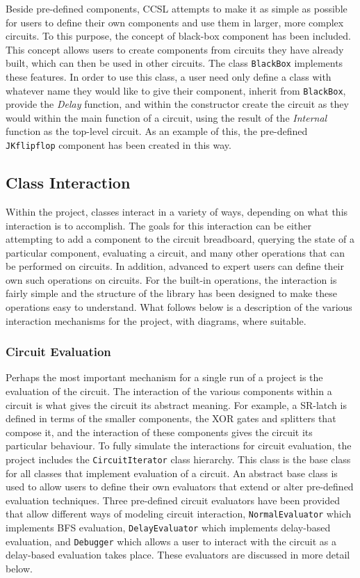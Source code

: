\documentclass{article}
\newcommand{\ClassName}[1]{\texttt{#1}}
\newcommand{\FunctionName}[1]{\textit{#1}}
\begin{document}
Beside pre-defined components, CCSL attempts to make it as simple as possible for users to define their own components and use them in larger, more complex circuits. To this purpose, the concept of black-box component has been included. This concept allows users to create components from circuits they have already built, which can then be used in other circuits. The class \ClassName{BlackBox} implements these features. In order to use this class, a user need only define a class with whatever name they would like to give their component, inherit from \ClassName{BlackBox}, provide the \FunctionName{Delay} function, and within the constructor create the circuit as they would within the main function of a circuit, using the result of the \FunctionName{Internal} function as the top-level circuit. As an example of this, the pre-defined \ClassName{JKflipflop} component has been created in this way.

\subsection{Class Interaction}

Within the project, classes interact in a variety of ways, depending on what this interaction is to accomplish. The goals for this interaction can be either attempting to add a component to the circuit breadboard, querying the state of a particular component, evaluating a circuit, and many other operations that can be performed on circuits. In addition, advanced to expert users can define their own such operations on circuits. For the built-in operations, the interaction is fairly simple and the structure of the library has been designed to make these operations easy to understand. What follows below is a description of the various interaction mechanisms for the project, with diagrams, where suitable.

\subsubsection{Circuit Evaluation}

Perhaps the most important mechanism for a single run of a project is the evaluation of the circuit. The interaction of the various components within a circuit is what gives the circuit its abstract meaning. For example, a SR-latch is defined in terms of the smaller components, the XOR gates and splitters that compose it, and the interaction of these components gives the circuit its particular behaviour. To fully simulate the interactions for circuit evaluation, the project includes the \ClassName{CircuitIterator} class hierarchy. This class is the base class for all classes that implement evaluation of a circuit.  An abstract base class is used to allow users to define their own evaluators that extend or alter pre-defined evaluation techniques. Three pre-defined circuit evaluators have been provided that allow different ways of modeling circuit interaction, \ClassName{NormalEvaluator} which implements BFS evaluation, \ClassName{DelayEvaluator} which implements delay-based evaluation, and \ClassName{Debugger}
 which allows a user to interact with the circuit as a delay-based evaluation takes place. These evaluators are discussed in more detail below.
\end{document}
